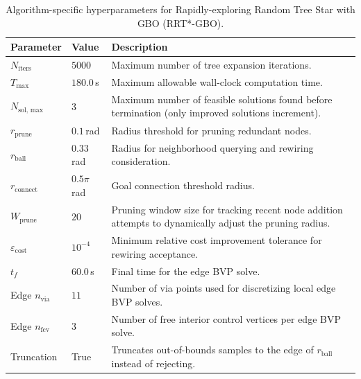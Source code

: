 \begin{table}[htbp]
    \centering
    \caption{Algorithm-specific hyperparameters for Rapidly-exploring Random Tree Star with GBO (RRT*-GBO).}
    \label{tab:params_rrt_gbo}
    \begin{tabularx}{\textwidth}{l l X}
        \toprule
        \textbf{Parameter} & \textbf{Value} & \textbf{Description} \\
        \midrule
        $N_{\text{iters}}$ & $5000$ & Maximum number of tree expansion iterations. \\
        $T_{\max}$ & $180.0$\,s & Maximum allowable wall-clock computation time. \\
        $N_{\text{sol, max}}$ & $3$ & Maximum number of feasible solutions found before termination (only improved solutions increment). \\
        $r_{\text{prune}}$ & $0.1$\,rad & Radius threshold for pruning redundant nodes. \\
        $r_{\text{ball}}$ & $0.33$\,rad & Radius for neighborhood querying and rewiring consideration. \\
        $r_{\text{connect}}$ & $0.5\pi$\,rad & Goal connection threshold radius. \\
        $W_{\text{prune}}$ & $20$ & Pruning window size for tracking recent node addition attempts to dynamically adjust the pruning radius. \\
        $\varepsilon_{\text{cost}}$ & $10^{-4}$ & Minimum relative cost improvement tolerance for rewiring acceptance. \\
        $t_f$ & $60.0$\,s & Final time for the edge BVP solve. \\
        Edge $n_{\text{via}}$ & $11$ & Number of via points used for discretizing local edge BVP solves. \\
        Edge $n_{\text{fcv}}$ & $3$ & Number of free interior control vertices per edge BVP solve. \\
        Truncation & True & Truncates out-of-bounds samples to the edge of $r_{\text{ball}}$ instead of rejecting. \\
        \bottomrule
    \end{tabularx}
\end{table}

